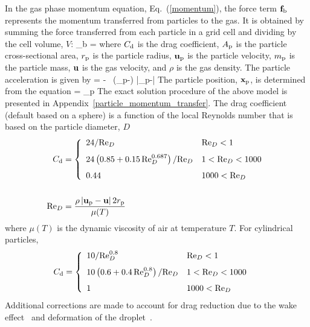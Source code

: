 In the gas phase momentum equation, Eq.~(\ref{momentum}), the force term ${\mathbf{f}}_{\rm b}$ represents the momentum transferred from particles to the gas.
It is obtained by summing the force transferred from each particle
in a grid cell and dividing by the cell volume, $V$:
\be
    {\bof_{\rm b}} =  \sum {}
\ee
where $C_{\rm d}$ is the drag coefficient, $A_{\rm p}$ is the particle cross-sectional area, $r_{\rm p}$ is the particle radius, ${\mathbf{u}}_{\rm p}$ is the particle velocity, $m_{\rm p}$ is the particle mass, ${\mathbf{u}}$ is the
gas velocity, and $\rho$ is the gas density. The particle acceleration is given by
\be
     = \bg - \ha {} \,
    (\bu_{\rm p}-\bu) |\bu_{\rm p}-\bu|
\ee
The particle position, ${\mathbf{x}}_{\rm p}$, is determined from the equation
\be
     = \bu_{\rm p}
\ee
The exact solution procedure of the above model is presented in Appendix~\ref{particle_momentum_transfer}. The drag coefficient (default based on a sphere) is a function of the local Reynolds number that is based on the particle diameter, $D$
\begin{align}
 C_{\rm d} &= \left\{ \begin{array}{ll}
     24/\hbox{Re}_D                                          & \hbox{Re}_D < 1    \\[0.1in]
     24\left(0.85+0.15 \, \hbox{Re}_D^{0.687} \right)/\hbox{Re}_D  & 1 < \hbox{Re}_D < 1000 \\[0.1in]
     0.44                                              & 1000 < \hbox{Re}_D
     \end{array} \right.  \\[0.2in]
\hbox{Re}_D &= \frac{\rho \, |{\mathbf{u}}_{\rm p}-{\mathbf{u}}| \, 2 r_{\rm p}}{\mu(T)} \end{align}
where $\mu(T)$ is the dynamic viscosity of air at temperature $T$. For cylindrical particles, 
\begin{align}
 C_{\rm d} &= \left\{ \begin{array}{ll}
     10/\hbox{Re}_D^{0.8}                                & \hbox{Re}_D < 1    \\[0.1in]
     10\left(0.6+0.4 \, \hbox{Re}_D^{0.8} \right)/\hbox{Re}_D  & 1 < \hbox{Re}_D < 1000 \\[0.1in]
     1                                             & 1000 < \hbox{Re}_D
     \end{array} \right. 
\end{align}
Additional corrections are made to account for drag reduction due to the wake effect~\cite{Ramirez:1} and deformation of the droplet~\cite{Loth:1}.

